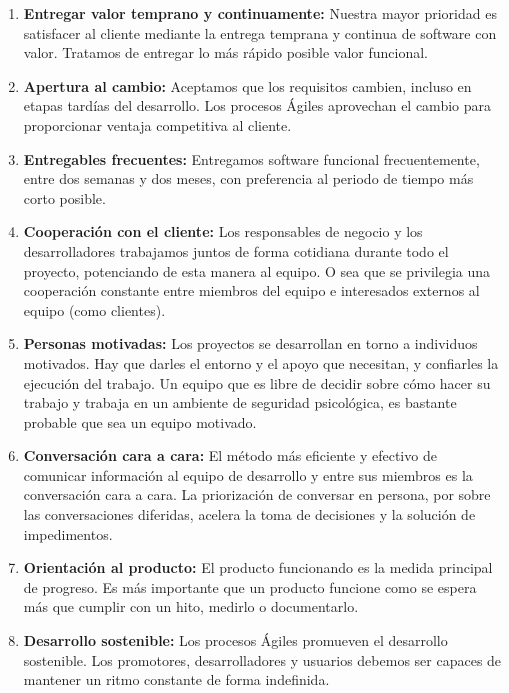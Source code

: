 \begin{enumerate}

\item \textbf{Entregar valor temprano y continuamente:} Nuestra mayor prioridad es satisfacer al cliente mediante la entrega temprana y continua de software con valor. Tratamos de entregar lo más rápido posible valor funcional.

\item \textbf{Apertura al cambio:} Aceptamos que los requisitos cambien, incluso en etapas tardías del desarrollo. Los procesos Ágiles aprovechan el cambio para proporcionar ventaja competitiva al cliente.

\item \textbf{Entregables frecuentes:} Entregamos software funcional frecuentemente, entre dos semanas y dos meses, con preferencia al periodo de tiempo más corto posible.

\item \textbf{Cooperación con el cliente:} Los responsables de negocio y los desarrolladores trabajamos juntos de forma cotidiana durante todo el proyecto, potenciando de esta manera al equipo. O sea que se privilegia una cooperación constante entre miembros del equipo e interesados externos al equipo (como clientes).

\item \textbf{Personas motivadas:} Los proyectos se desarrollan en torno a individuos motivados. Hay que darles el entorno y el apoyo que necesitan, y confiarles la ejecución del trabajo. Un equipo que es libre de decidir sobre cómo hacer su trabajo y trabaja en un ambiente de seguridad psicológica, es bastante probable que sea un equipo motivado.

\item \textbf{Conversación cara a cara:} El método más eficiente y efectivo de comunicar información al equipo de desarrollo y entre sus miembros es la conversación cara a cara. La priorización de conversar en persona, por sobre las conversaciones diferidas, acelera la toma de decisiones y la solución de impedimentos.

\item \textbf{Orientación al producto:} El producto funcionando es la medida principal de progreso. Es más importante que un producto funcione como se espera más que cumplir con un hito, medirlo o documentarlo.

\item \textbf{Desarrollo sostenible:} Los procesos Ágiles promueven el desarrollo sostenible. Los promotores, desarrolladores y usuarios debemos ser capaces de mantener un ritmo constante de forma indefinida.


\end{enumerate}
